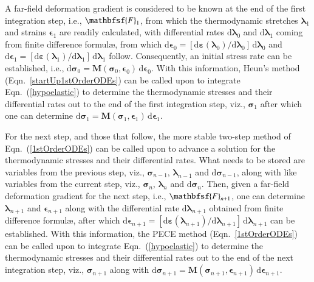 A far-field deformation gradient is considered to be known at the end of the first integration step, i.e., $\mathbfsf{F}_1$, from which the thermo\-dynamic stretches $\boldsymbol{\lambda}_1$ and strains $\boldsymbol{\epsilon}_1$ are readily calculated, with differential rates $\mathrm{d} \boldsymbol{\lambda}_0$ and $\mathrm{d} \boldsymbol{\lambda}_1$ coming from finite difference formul\ae, from which $\mathrm{d} \boldsymbol{\epsilon}_0 = [ \mathrm{d} \boldsymbol{\varepsilon} ( \boldsymbol{\lambda}_0 ) / \mathrm{d} \boldsymbol{\lambda}_0 ] \, \mathrm{d} \boldsymbol{\lambda}_0$ and $\mathrm{d} \boldsymbol{\epsilon}_1 = [ \mathrm{d} \boldsymbol{\varepsilon} ( \boldsymbol{\lambda}_1 ) / \mathrm{d} \boldsymbol{\lambda}_1 ] \, \mathrm{d} \boldsymbol{\lambda}_1$ follow.  Consequently, an initial stress rate can be established, i.e., $\mathrm{d} \boldsymbol{\sigma}_0 = \mathbf{M} ( \boldsymbol{\sigma}_0 , \boldsymbol{\epsilon}_0 ) \, \mathrm{d} \boldsymbol{\epsilon}_0$.  With this information, Heun's method (Eqn.~\ref{startUp1stOrderODEs}) can be called upon to integrate Eqn.~(\ref{hypoelastic}) to determine the thermo\-dynamic stresses and their differential rates out to the end of the first integration step, viz., $\boldsymbol{\sigma}_1$ after which one can determine $\mathrm{d} \boldsymbol{\sigma}_1 = \mathbf{M} ( \boldsymbol{\sigma}_1 , \boldsymbol{\epsilon}_1 ) \, \mathrm{d} \boldsymbol{\epsilon}_1$.    

For the next step, and those that follow, the more stable two-step method of Eqn.~(\ref{1stOrderODEs}) can be called upon to advance a solution for the thermo\-dynamic stresses and their differential rates.  What needs to be stored are variables from the previous step, viz., $\boldsymbol{\sigma}_{n-1}$, $\boldsymbol{\lambda}_{n-1}$ and $\mathrm{d} \boldsymbol{\sigma}_{n-1}$, along with like variables from the current step, viz.,  $\boldsymbol{\sigma}_n$, $\boldsymbol{\lambda}_n$ and $\mathrm{d} \boldsymbol{\sigma}_n$.  Then, given a far-field deformation gradient for the next step, i.e., $\mathbfsf{F}_{n+1}$, one can determine $\boldsymbol{\lambda}_{n+1}$ and $\boldsymbol{\epsilon}_{n+1}$ along with the differential rate $\mathrm{d} \boldsymbol{\lambda}_{n+1}$ obtained from finite difference formul\ae, after which $\mathrm{d} \boldsymbol{\epsilon}_{n+1} = [ \mathrm{d} \boldsymbol{\varepsilon} ( \boldsymbol{\lambda}_{n+1} ) / \mathrm{d} \boldsymbol{\lambda}_{n+1} ] \, \mathrm{d} \boldsymbol{\lambda}_{n+1}$ can be established.  With this information, the PECE method (Eqn.~\ref{1stOrderODEs}) can be called upon to integrate Eqn.~(\ref{hypoelastic}) to determine the thermo\-dynamic stresses and their differential rates out to the end of the next integration step, viz., $\boldsymbol{\sigma}_{n+1}$ along with $\mathrm{d} \boldsymbol{\sigma}_{n+1} = \mathbf{M} ( \boldsymbol{\sigma}_{n+1} , \boldsymbol{\epsilon}_{n+1} ) \, \mathrm{d} \boldsymbol{\epsilon}_{n+1}$.


